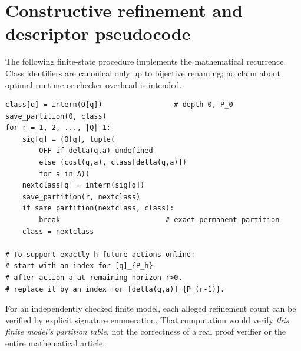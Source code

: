 \documentclass[11pt,letterpaper]{article}
\begin{document}
\section{Constructive refinement and descriptor pseudocode}\label{app:alg}
The following finite-state procedure implements the mathematical recurrence. Class identifiers are canonical only up to bijective renaming; no claim about optimal runtime or checker overhead is intended.
\begin{verbatim}
class[q] = intern(O[q])                 # depth 0, P_0
save_partition(0, class)
for r = 1, 2, ..., |Q|-1:
    sig[q] = (O[q], tuple(
        OFF if delta(q,a) undefined
        else (cost(q,a), class[delta(q,a)])
        for a in A))
    nextclass[q] = intern(sig[q])
    save_partition(r, nextclass)
    if same_partition(nextclass, class):
        break                         # exact permanent partition
    class = nextclass

# To support exactly h future actions online:
# start with an index for [q]_{P_h}
# after action a at remaining horizon r>0,
# replace it by an index for [delta(q,a)]_{P_(r-1)}.
\end{verbatim}
For an independently checked finite model, each alleged refinement count can be verified by explicit signature enumeration. That computation would verify \emph{this finite model's partition table}, not the correctness of a real proof verifier or the entire mathematical article.
\end{document}
